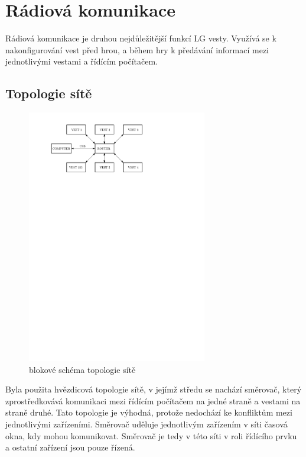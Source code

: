 \chapter{Rádiová komunikace}
Rádiová komunikace je druhou nejdůležitější funkcí LG vesty. Využívá se k nakonfigurování vest před hrou, a během hry k předávání informací mezi jednotlivými vestami a řídícím počítačem.

\section{Topologie sítě}
\begin{figure}[H]
    \begin{center}
        \includegraphics[width=0.7\textwidth]{img/rf-network}
    \end{center}
    \caption{blokové schéma topologie sítě}
\end{figure}
Byla použita hvězdicová topologie sítě, v jejímž středu se nachází směrovač, který zprostředkovává komunikaci mezi řídícím počítačem na jedné straně a vestami na straně druhé. Tato topologie je výhodná, protože nedochází ke konfliktům mezi jednotlivými zařízeními. Směrovač uděluje jednotlivým zařízením v síti časová okna, kdy mohou komunikovat. Směrovač je tedy v této síti v roli řídícího prvku a ostatní zařízení jsou pouze řízená.

